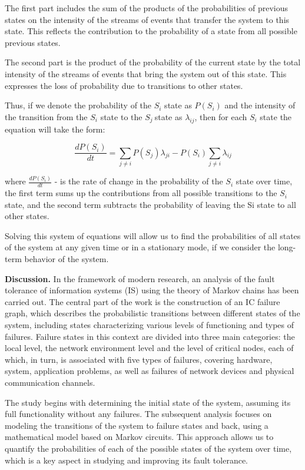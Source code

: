 The first part includes the sum of the products of the probabilities of
previous states on the intensity of the streams of events that transfer
the system to this state. This reflects the contribution to the
probability of a state from all possible previous states.

The second part is the product of the probability of the current state
by the total intensity of the streams of events that bring the system
out of this state. This expresses the loss of probability due to
transitions to other states.

Thus, if we denote the probability of the \(S_{i}\) state as
\(P(S_{i})\) and the intensity of the transition from the \(S_{i}\)
state to the \(S_{j}\ \)state as \(\lambda_{ij}\), then for each
\(S_{i}\) state the equation will take the form:

\[\frac{dP(S_{i})}{dt} = \sum_{j \neq i}^{}{P(S_{j})}\lambda_{ji} - P(S_{i})\sum_{j \neq i}^{}\lambda_{ij}\]

where \(\frac{dP(S_{i})}{dt}\) - is the rate of change in the
probability of the \(S_{i}\) state over time, the first term sums up the
contributions from all possible transitions to the \(S_{i}\) state, and
the second term subtracts the probability of leaving the Si state to all
other states.

Solving this system of equations will allow us to find the probabilities
of all states of the system at any given time or in a stationary mode,
if we consider the long-term behavior of the system.

\textbf{Discussion.} In the framework of modern research, an analysis of
the fault tolerance of information systems (IS) using the theory of
Markov chains has been carried out. The central part of the work is the
construction of an IC failure graph, which describes the probabilistic
transitions between different states of the system, including states
characterizing various levels of functioning and types of failures.
Failure states in this context are divided into three main categories:
the local level, the network environment level and the level of critical
nodes, each of which, in turn, is associated with five types of
failures, covering hardware, system, application problems, as well as
failures of network devices and physical communication channels.

The study begins with determining the initial state of the system,
assuming its full functionality without any failures. The subsequent
analysis focuses on modeling the transitions of the system to failure
states and back, using a mathematical model based on Markov circuits.
This approach allows us to quantify the probabilities of each of the
possible states of the system over time, which is a key aspect in
studying and improving its fault tolerance.

